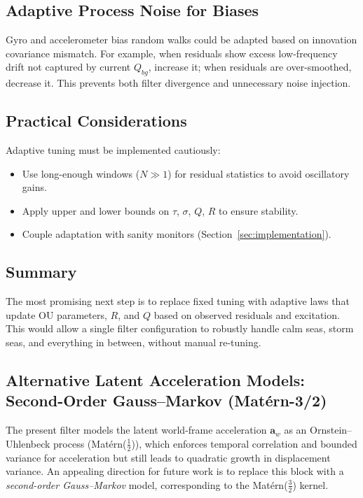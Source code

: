 \documentclass[10pt]{extarticle}
\begin{document}
\subsection{Adaptive Process Noise for Biases}
Gyro and accelerometer bias random walks could be adapted based on innovation covariance mismatch.
For example, when residuals show excess low-frequency drift not captured by current $Q_{bg}$,
increase it; when residuals are over-smoothed, decrease it. This prevents both filter divergence
and unnecessary noise injection.

\subsection{Practical Considerations}
Adaptive tuning must be implemented cautiously:
\begin{itemize}
\item Use long-enough windows ($N\gg 1$) for residual statistics to avoid oscillatory gains.
\item Apply upper and lower bounds on $\tau$, $\sigma$, $Q$, $R$ to ensure stability.
\item Couple adaptation with sanity monitors (Section~\ref{sec:implementation}).
\end{itemize}

\subsection{Summary}
The most promising next step is to replace fixed tuning with adaptive laws that update
OU parameters, $R$, and $Q$ based on observed residuals and excitation. This would allow
a single filter configuration to robustly handle calm seas, storm seas, and everything in
between, without manual re-tuning.

\subsection{Alternative Latent Acceleration Models: Second-Order Gauss--Markov (Mat\'ern-3/2)}

The present filter models the latent world-frame acceleration $\bm a_w$ as an Ornstein--Uhlenbeck
process (Mat\'ern($\tfrac{1}{2}$)), which enforces temporal correlation and bounded variance for acceleration but
still leads to quadratic growth in displacement variance. An appealing direction for future work
is to replace this block with a \emph{second-order Gauss--Markov} model, corresponding to the
Mat\'ern($\tfrac{3}{2}$) kernel.
\end{document}
